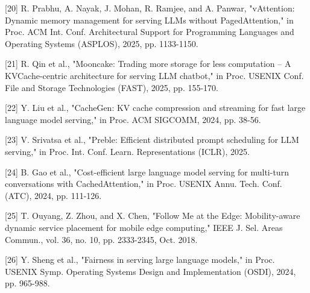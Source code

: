 \documentclass[a4paper,twocolumn,10pt]{ctexart}
\begin{document}
[20] R. Prabhu, A. Nayak, J. Mohan, R. Ramjee, and A. Panwar, "vAttention: Dynamic memory management for serving LLMs without PagedAttention," in Proc. ACM Int. Conf. Architectural Support for Programming Languages and Operating Systems (ASPLOS), 2025, pp. 1133-1150.


[21] R. Qin et al., "Mooncake: Trading more storage for less computation -- A KVCache-centric architecture for serving LLM chatbot," in Proc. USENIX Conf. File and Storage Technologies (FAST), 2025, pp. 155-170.


[22] Y. Liu et al., "CacheGen: KV cache compression and streaming for fast large language model serving," in Proc. ACM SIGCOMM, 2024, pp. 38-56.


[23] V. Srivatsa et al., "Preble: Efficient distributed prompt scheduling for LLM serving," in Proc. Int. Conf. Learn. Representations (ICLR), 2025.


[24] B. Gao et al., "Cost-efficient large language model serving for multi-turn conversations with CachedAttention," in Proc. USENIX Annu. Tech. Conf. (ATC), 2024, pp. 111-126.


[25] T. Ouyang, Z. Zhou, and X. Chen, "Follow Me at the Edge: Mobility-aware dynamic service placement for mobile edge computing," IEEE J. Sel. Areas Commun., vol. 36, no. 10, pp. 2333-2345, Oct. 2018.


[26] Y. Sheng et al., "Fairness in serving large language models," in Proc. USENIX Symp. Operating Systems Design and Implementation (OSDI), 2024, pp. 965-988.
\end{document}
